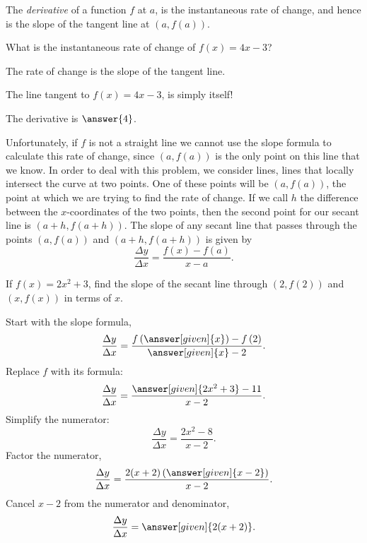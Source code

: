 \documentclass{ximera}
\begin{document}
The \textit{derivative} of a function $f$ at $a$, is the instantaneous
rate of change, and hence is the slope of the tangent line at $(a,f(a))$. 

\begin{question}
	What is the instantaneous rate of change of $f(x) = 4x-3$?
	\begin{hint}
		The rate of change is the slope of the tangent line.
	\end{hint}
	\begin{hint}
		The line tangent to $f(x) = 4x-3$, is simply itself!
	\end{hint}
	\begin{prompt}
		The derivative is $\answer{4}$.
	\end{prompt}
\end{question}


Unfortunately, if $f$ is not a straight line we cannot use the slope
formula to calculate this rate of change, since $(a,f(a))$ is the only
point on this line that we know.  In order to deal with this problem,
we consider  lines, lines that locally intersect the curve
at two points.  One of these points will be $(a, f(a))$, the point at
which we are trying to find the rate of change.  If we call $h$ the
difference between the $x$-coordinates of the two points, then the
second point for our secant line is $(a+h, f(a+h))$.  The slope of any
secant line that passes through the points $(a,f(a))$ and $(a+h,
f(a+h))$ is given by
\[
\frac{\Delta y}{\Delta x}=\frac{f(x) - f(a)}{x - a}.
\]

\begin{example}
	If $f(x) = 2x^2+3$, find the slope of the secant line through $(2,f(2))$
	and $(x,f(x))$ in terms of $x$.
	
	\begin{explanation}
		Start with the slope formula,
		\[
		\frac{\Delta y}{\Delta x} =
                \frac{f\left(\answer[given]{x}\right)-f\left(2\right)}
                     {\answer[given]{x} - 2}.
		\]
		Replace $f$ with its formula:
		\[
		\frac{\Delta y}{\Delta x} = \frac{\answer[given]{2x^2+3} - 11}{x-2}.
		\]
		Simplify the numerator:
		\[
		\frac{\Delta y}{\Delta x} = \frac{2x^2-8}{x-2}.
		\]
		Factor the numerator,
		\[
		\frac{\Delta y}{\Delta x} = \frac{2(x+2)\left(\answer[given]{x-2}\right)}{x-2}.
		\]
		Cancel $x-2$ from the numerator and denominator,
		\[
		\frac{\Delta y}{\Delta x} = \answer[given]{2(x+2)}.
		\]
	\end{explanation}
\end{example}
\end{document}
